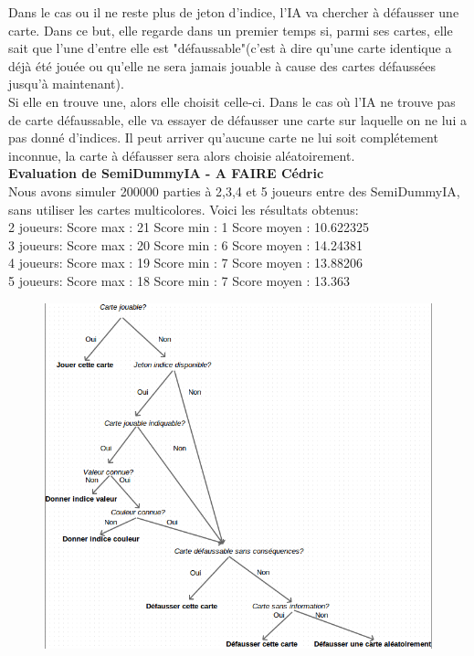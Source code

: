 \documentclass[11pt, letterpaper]{article}
\begin{document}
\noindent Dans le cas ou il ne reste plus de jeton d'indice, l'IA va chercher à défausser une carte. Dans ce but, elle regarde dans un premier temps si, parmi ses cartes, elle sait que l'une d'entre elle est "défaussable"(c'est à dire qu'une carte identique a déjà été jouée ou qu'elle ne sera jamais jouable à cause des cartes défaussées jusqu'à maintenant).\\

\noindent Si elle en trouve une, alors elle choisit celle-ci. Dans le cas où l'IA ne trouve pas de carte défaussable, elle va essayer de défausser une carte sur laquelle on ne lui a pas donné d'indices. Il peut arriver qu'aucune carte ne lui soit complétement inconnue, la carte à défausser sera alors choisie aléatoirement.\\

\noindent \textbf{Evaluation de SemiDummyIA - A FAIRE Cédric}\\
\noindent Nous avons simuler 200000 parties à 2,3,4 et 5 joueurs entre des SemiDummyIA, sans utiliser les cartes multicolores. Voici les résultats obtenus:\\

2 joueurs: Score max : 21 Score min : 1 Score moyen : 10.622325\\
3 joueurs: Score max : 20 Score min : 6 Score moyen : 14.24381\\
4 joueurs: Score max : 19 Score min : 7 Score moyen : 13.88206\\
5 joueurs: Score max : 18 Score min : 7 Score moyen : 13.363\\




\begin{figure}[H]
\begin{center}
\includegraphics[scale = 0.3]{flow_chart_semidummy.png}
\end{center}
\end{figure}
\end{document}
